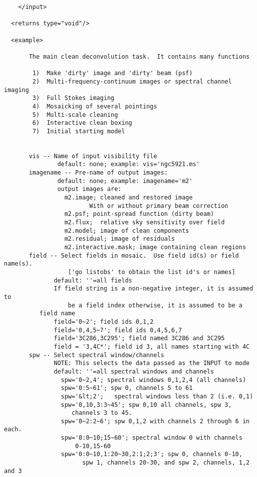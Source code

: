 \begin{verbatim}
    </input>

  <returns type="void"/>

  <example>

       The main clean deconvolution task.  It contains many functions
 
        1)  Make 'dirty' image and 'dirty' beam (psf)
        2)  Multi-frequency-continuum images or spectral channel imaging
        3)  Full Stokes imaging
        4)  Mosaicking of several pointings
        5)  Multi-scale cleaning
        6)  Interactive clean boxing
        7)  Initial starting model
 
 
       vis -- Name of input visibility file
               default: none; example: vis='ngc5921.ms'
       imagename -- Pre-name of output images:
               default: none; example: imagename='m2'
               output images are:
                 m2.image; cleaned and restored image
                        With or without primary beam correction
                 m2.psf; point-spread function (dirty beam)
                 m2.flux;  relative sky sensitivity over field
                 m2.model; image of clean components
                 m2.residual; image of residuals
                 m2.interactive.mask; image containing clean regions
       field -- Select fields in mosaic.  Use field id(s) or field name(s).
                  ['go listobs' to obtain the list id's or names]
              default: ''=all fields
              If field string is a non-negative integer, it is assumed to
                  be a field index otherwise, it is assumed to be a 
		  field name
              field='0~2'; field ids 0,1,2
              field='0,4,5~7'; field ids 0,4,5,6,7
              field='3C286,3C295'; field named 3C286 and 3C295
              field = '3,4C*'; field id 3, all names starting with 4C
       spw -- Select spectral window/channels
              NOTE: This selects the data passed as the INPUT to mode
              default: ''=all spectral windows and channels
                spw='0~2,4'; spectral windows 0,1,2,4 (all channels)
                spw='0:5~61'; spw 0, channels 5 to 61
                spw='&lt;2';   spectral windows less than 2 (i.e. 0,1)
                spw='0,10,3:3~45'; spw 0,10 all channels, spw 3, 
				   channels 3 to 45.
                spw='0~2:2~6'; spw 0,1,2 with channels 2 through 6 in each.
                spw='0:0~10;15~60'; spectral window 0 with channels 
				    0-10,15-60
                spw='0:0~10,1:20~30,2:1;2;3'; spw 0, channels 0-10,
                      spw 1, channels 20-30, and spw 2, channels, 1,2 and 3

\end{verbatim}
